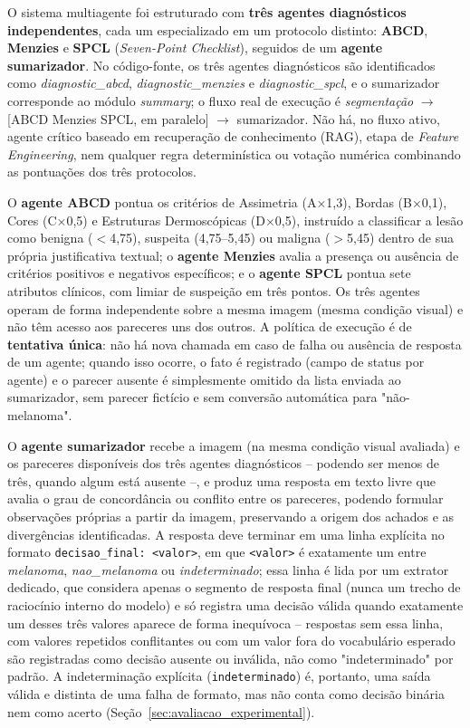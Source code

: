 O sistema multiagente foi estruturado com \textbf{três agentes diagnósticos independentes}, cada um especializado em um protocolo distinto: \textbf{ABCD}, \textbf{Menzies} e \textbf{SPCL} (\textit{Seven-Point Checklist}), seguidos de um \textbf{agente sumarizador}. No código-fonte, os três agentes diagnósticos são identificados como \textit{diagnostic\_abcd}, \textit{diagnostic\_menzies} e \textit{diagnostic\_spcl}, e o sumarizador corresponde ao módulo \textit{summary}; o fluxo real de execução é \textit{segmentação} $\rightarrow$ [ABCD \textbar{} Menzies \textbar{} SPCL, em paralelo] $\rightarrow$ sumarizador. Não há, no fluxo ativo, agente crítico baseado em recuperação de conhecimento (RAG), etapa de \textit{Feature Engineering}, nem qualquer regra determinística ou votação numérica combinando as pontuações dos três protocolos.

O \textbf{agente ABCD} pontua os critérios de Assimetria (A×1,3), Bordas (B×0,1), Cores (C×0,5) e Estruturas Dermoscópicas (D×0,5), instruído a classificar a lesão como benigna ($<$4,75), suspeita (4,75--5,45) ou maligna ($>$5,45) dentro de sua própria justificativa textual; o \textbf{agente Menzies} avalia a presença ou ausência de critérios positivos e negativos específicos; e o \textbf{agente SPCL} pontua sete atributos clínicos, com limiar de suspeição em três pontos. Os três agentes operam de forma independente sobre a mesma imagem (mesma condição visual) e não têm acesso aos pareceres uns dos outros. A política de execução é de \textbf{tentativa única}: não há nova chamada em caso de falha ou ausência de resposta de um agente; quando isso ocorre, o fato é registrado (campo de status por agente) e o parecer ausente é simplesmente omitido da lista enviada ao sumarizador, sem parecer fictício e sem conversão automática para "não-melanoma".

O \textbf{agente sumarizador} recebe a imagem (na mesma condição visual avaliada) e os pareceres disponíveis dos três agentes diagnósticos -- podendo ser menos de três, quando algum está ausente --, e produz uma resposta em texto livre que avalia o grau de concordância ou conflito entre os pareceres, podendo formular observações próprias a partir da imagem, preservando a origem dos achados e as divergências identificadas. A resposta deve terminar em uma linha explícita no formato \texttt{decisao\_final: <valor>}, em que \texttt{<valor>} é exatamente um entre \textit{melanoma}, \textit{nao\_melanoma} ou \textit{indeterminado}; essa linha é lida por um extrator dedicado, que considera apenas o segmento de resposta final (nunca um trecho de raciocínio interno do modelo) e só registra uma decisão válida quando exatamente um desses três valores aparece de forma inequívoca -- respostas sem essa linha, com valores repetidos conflitantes ou com um valor fora do vocabulário esperado são registradas como decisão ausente ou inválida, não como "indeterminado" por padrão. A indeterminação explícita (\texttt{indeterminado}) é, portanto, uma saída válida e distinta de uma falha de formato, mas não conta como decisão binária nem como acerto (Seção~\ref{sec:avaliacao_experimental}).

